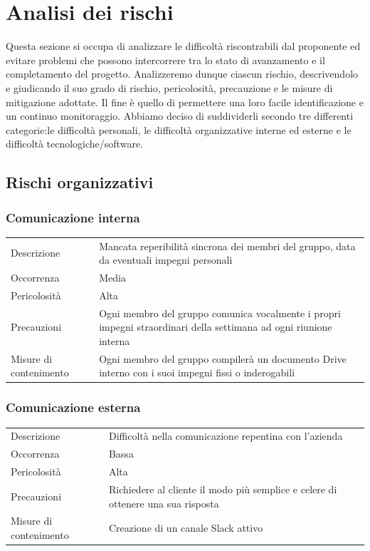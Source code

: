 \documentclass{article}
\begin{document}
\section{Analisi dei rischi}
Questa sezione si occupa di analizzare le difficoltà riscontrabili dal proponente ed evitare problemi che possono intercorrere tra lo stato di avanzamento e il completamento del progetto. Analizzeremo dunque ciascun rischio, descrivendolo e giudicando il suo grado di rischio, pericolosità, precauzione e le misure di mitigazione adottate. Il fine è quello di permettere una loro facile identificazione e un continuo monitoraggio. Abbiamo deciso di suddividerli secondo tre differenti categorie:le difficoltà personali, le difficoltà organizzative interne ed esterne e le difficoltà tecnologiche/software.

\subsection{Rischi organizzativi}
\subsubsection{Comunicazione interna}
\begin{center}
\begin{tabular}{P{10em} P{20em}} 
     Descrizione & Mancata reperibilità sincrona dei membri del gruppo, data da eventuali impegni personali\\ 
    Occorrenza & Media\\
    Pericolosità & Alta \\
    Precauzioni & Ogni membro del gruppo comunica vocalmente i propri impegni straordinari della settimana ad ogni riunione interna \\
    Misure di contenimento & Ogni membro del gruppo compilerà un documento Drive interno  con i suoi impegni fissi o inderogabili \\
\end{tabular}
\end{center}

\subsubsection{Comunicazione esterna}
\begin{center}
\begin{tabular}{P{10em} P{20em}} 
     Descrizione & Difficoltà nella comunicazione repentina con l'azienda\\ 
    Occorrenza & Bassa\\
    Pericolosità & Alta \\
    Precauzioni & Richiedere al cliente il modo più semplice e celere di ottenere una sua risposta \\
    Misure di contenimento & Creazione di un canale Slack attivo\\
\end{tabular}
\end{center}
\end{document}
